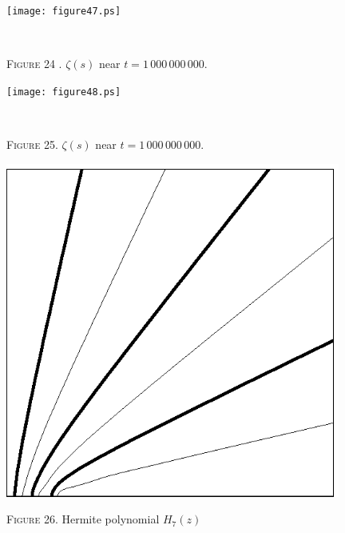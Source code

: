 \documentclass[a4paper]{amsart}
\numberwithin{equation}{section}
\begin{document}
\begin{minipage}{335.7426pt}
\hskip-24.2574pt\texttt{[image: figure47.ps]} 
\end{minipage}
\centerline{\ }
\vfil
\centerline{{\scshape Figure 24} .  $\zeta(s)$ near $t=1\,000\,000\,000$.}
\vfil\eject

\begin{minipage}{335.7426pt}
\hskip-24.2574pt\texttt{[image: figure48.ps]} 
\end{minipage}
\centerline{\ }
\vfil
\centerline{{\scshape Figure} 25.  $\zeta(s)$ near $t=1\,000\,000\,000$.}
\vfil\eject



\begin{minipage}{321pt}
\bigskip
\includegraphics[width=312pt]{figure49.ps}
\vfil
\centerline{{\scshape Figure} 26. Hermite polynomial $H_{7}(z)$}
\end{minipage}
\medskip
\end{document}
